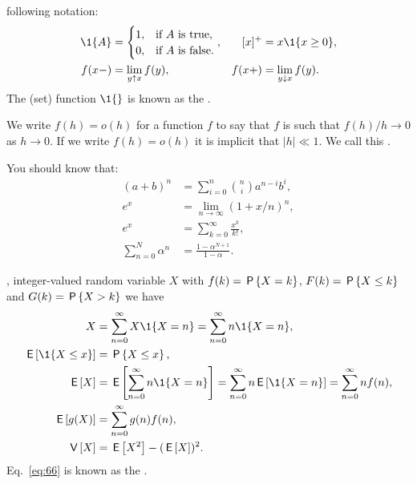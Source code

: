 \documentclass[queueing-book]{subfiles}
\begin{document}
 following notation:
 \begin{align}
 \1{A} &=
 \begin{cases}
 1, & \text{if $A$ is true}, \\
 0, & \text{if $A$ is false}.
 \end{cases},
& [x]^+ &= x \1{x\geq 0}, \\
 f(x-) &= \lim_{y\uparrow x} f(y), &
 f(x+) &= \lim_{y\downarrow x} f(y).\label{eq:5}
\end{align}
The (set) function $\1{}$ is known as the .

We write $f(h)=o(h)$ for a function $f$ to say that $f$ is such that $f(h)/h \to 0$ as $h\to 0$.
If we write $f(h) = o(h)$ it is implicit that $|h| \ll 1$.
We call this .


You should know that:
\begin{subequations}
 \begin{align}
 (a+b)^n &= \sum_{i=0}^n {n \choose i} a^{n-i} b^i, \label{eq:71}\\
e^x &= \lim_{n\to\infty} (1+x/n)^n, \label{eq:65}\\
 e^x &= \sum_{k=0}^{\infty} \frac{x^k}{k!}, \label{eq:76}\\
 \sum_{n=0}^N \alpha^n &= \frac{1-\alpha^{N+1}}{1-\alpha}. \label{eq:61}
\end{align}
\end{subequations}

, integer-valued random variable $X$ with  $f(k)= \P{X = k}$,
 $F(k)=\P{X\leq k}$ and  $G(k) = \P{X>k}$ we have
\begin{subequations}\label{eq:105}
\begin{align}
X&=\sum_{n=0}^\infty X\1{X=n} = \sum_{n=0}^\infty n \1{X=n}, \label{eq:77} \\
\E{\1{X\leq x}} &= \P{X\leq x}, \label{eq:74}\\
\E X &= \E{\sum_{n=0}^\infty n \1{X=n}} = \sum_{n=0}^\infty n \E{\1{X=n}} = \sum_{n=0}^\infty n f(n), \label{eq:p-78} \\
  \E{g(X)} &= \sum_{n=0}^\infty g(n) f(n), \label{eq:66} \\
  \V X &= \E{X^2} - (\E X)^2.\label{eq:68}\\
\end{align}
\end{subequations}
Eq.~\cref{eq:66} is known as the .
\end{document}
